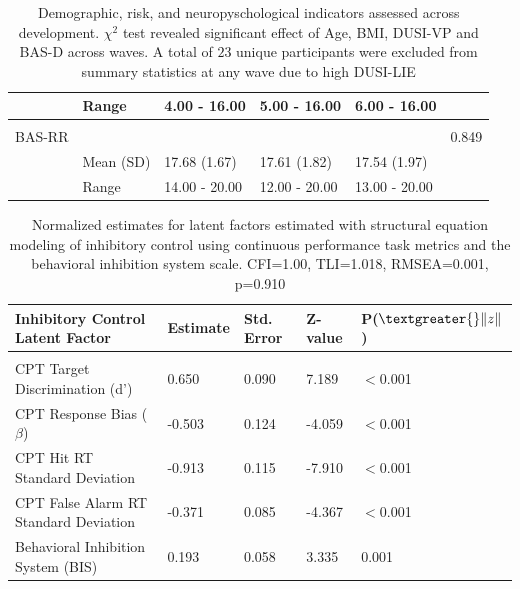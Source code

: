 \documentclass[utf8]{stylesheet}
\begin{document}
\begin{table}[h!]
\begin{tabular}{llllll}
                    & Range           & 4.00 - 16.00   & 5.00 - 16.00   & 6.00 - 16.00 &                          \\ \hline \\
BAS-RR         &                 &                  &                  &                  & 0.849                    \\
                    & Mean (SD)       & 17.68 (1.67)   & 17.61 (1.82)   & 17.54 (1.97)   &                          \\
                    & Range           & 14.00 - 20.00 & 12.00 - 20.00  & 13.00 - 20.00   &
\end{tabular}
\caption{Demographic, risk, and neuropyschological indicators assessed across development. $\chi^2$ test revealed significant effect of Age, BMI, DUSI-VP and BAS-D across waves. A total of $23$ unique participants were excluded from summary statistics at any wave due to high DUSI-LIE\label{tab:1}}
\end{table}
\begin{table}[h!]
\begin{tabular}{lllll}
Inhibitory Control Latent Factor                                               & Estimate & Std. Error & Z-value & P($\textgreater{}\|z\|$) \\ \hline \\
CPT Target Discrimination (d')         & 0.650 & 0.090      & 7.189  & $<$0.001                \\ 
CPT Response Bias ($\beta$)                  & -0.503   & 0.124      & -4.059  & $<$0.001         \\ 
CPT Hit RT Standard Deviation                           & -0.913    & 0.115      & -7.910   & $<$0.001 \\
CPT False Alarm RT Standard Deviation                       & -0.371   & 0.085      & -4.367  & $<$0.001 \\ 
Behavioral Inhibition System (BIS)                             & 0.193    & 0.058      & 3.335   & 0.001
\end{tabular}
\caption{Normalized estimates for latent factors estimated with structural equation modeling of inhibitory control using continuous performance task metrics and the behavioral inhibition system scale. CFI=1.00, TLI=1.018, RMSEA=0.001, p=0.910\label{tab:2}}
\end{table}
\end{document}
